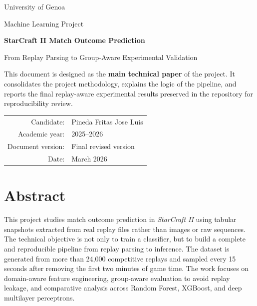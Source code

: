 \documentclass[11pt,a4paper]{article}
\begin{document}
	
	\begin{titlepage}
		\centering
		\vspace*{2.2cm}
		{\Large University of Genoa\par}
		\vspace{0.4cm}
		{\large Machine Learning Project\par}
		\vspace{1.6cm}
		{\Huge\bfseries StarCraft II Match Outcome Prediction\par}
		\vspace{0.35cm}
		{\Large From Replay Parsing to Group-Aware Experimental Validation\par}
		\vspace{1.3cm}
		\begin{tcolorbox}[width=0.88\textwidth,colback=softblue,colframe=accent,arc=2mm,boxrule=0.8pt]
			This document is designed as the \textbf{main technical paper} of the project. It consolidates the project methodology, explains the logic of the pipeline, and reports the final replay-aware experimental results preserved in the repository for reproducibility review.
		\end{tcolorbox}
		\vfill
		\begin{tabular}{rl}
			Candidate: & Pineda Fritas Jose Luis \\
			Academic year: & 2025--2026 \\
			Document version: & Final revised version \\
			Date: & March 2026 \\
		\end{tabular}
		\vfill
	\end{titlepage}
	
	
	\section*{Abstract}
	This project studies match outcome prediction in \emph{StarCraft II} using tabular snapshots extracted from real replay files rather than images or raw sequences. The technical objective is not only to train a classifier, but to build a complete and reproducible pipeline from replay parsing to inference. The dataset is generated from more than 24,000 competitive replays and sampled every 15 seconds after removing the first two minutes of game time. The work focuses on domain-aware feature engineering, group-aware evaluation to avoid replay leakage, and comparative analysis across Random Forest, XGBoost, and deep multilayer perceptrons.
	
\end{document}
